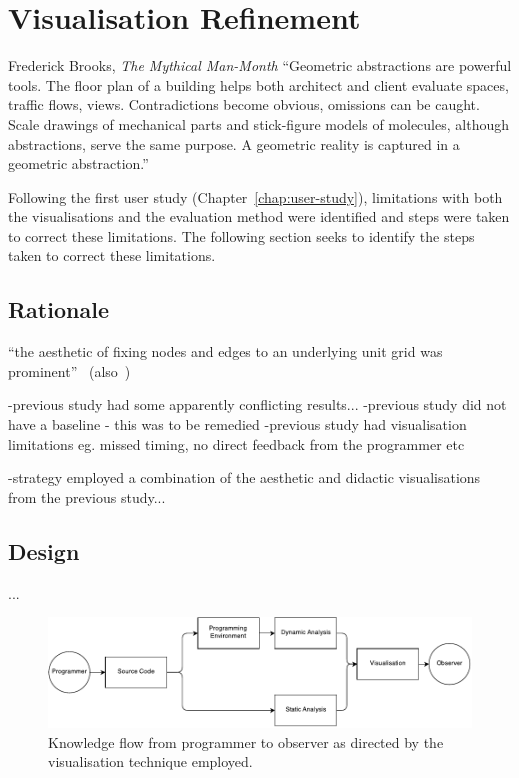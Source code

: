 
\chapter{Visualisation Refinement}
\label{chap:visualisation-refinement}

\begin{chapquote}{Frederick Brooks, \textit{The Mythical Man-Month}}
``Geometric abstractions are powerful tools. The floor plan of a building helps both architect and client evaluate spaces, traffic flows, views. Contradictions become obvious, omissions can be caught. Scale drawings of mechanical parts and stick-figure models of molecules, although abstractions, serve the same purpose. A geometric reality is captured in a geometric abstraction.''
\end{chapquote}

Following the first user study (Chapter~\ref{chap:user-study}), limitations with both the visualisations and the evaluation method were identified and steps were taken to correct these limitations. The following section seeks to identify the steps taken to correct these limitations.

\section{Rationale}


``the aesthetic of fixing nodes and edges to an underlying unit grid was prominent''~\cite{Purchase2014} (also~\cite{Purchase2001,Purchase1996})

-previous study had some apparently conflicting results...
-previous study did not have a baseline - this was to be remedied
-previous study had visualisation limitations eg. missed timing, no direct feedback from the programmer etc


-strategy employed a combination of the aesthetic and didactic visualisations from the previous study...

\section{Design}

\cite{Purchase1996}...

\begin{figure}
  \centering \includegraphics[width=\columnwidth]{../images/diagrams/knowledge-flow-refined.pdf}
  \caption{Knowledge flow from programmer to observer as directed by the visualisation technique employed.}
\label{fig:knowledge-flow-refined}
\end{figure}

